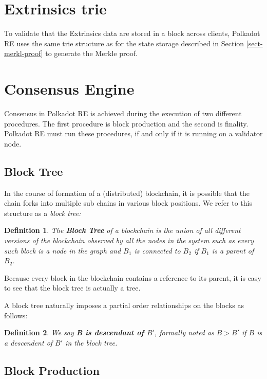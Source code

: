 \documentclass{article}
\newcommand{\tmem}[1]{{\em #1\/}}
\newcommand{\tmstrong}[1]{\textbf{#1}}
\newcommand{\tmtextbf}[1]{{\bfseries{#1}}}
\newcommand{\tmtextit}[1]{{\itshape{#1}}}
\newtheorem{definition}{Definition}
\providecommand{\tmem}[1]{\tmtextit{#1}}
\providecommand{\tmstrong}[1]{\tmtextbf{#1}}
\providecommand{\tmtextbf}[1]{\tmtextbf{#1}}
\providecommand{\tmtextit}[1]{\tmtextit{#1}}
\newtheorem{definition}{Definition}
\begin{document}
\section{Extrinsics trie}

To validate that the Extrinsics data are stored in a block across clients,
Polkadot RE uses the same trie structure as for the state storage described in
Section \ref{sect-merkl-proof} to generate the Merkle proof.

\section{Consensus Engine}

Consensus in Polkadot RE is achieved during the execution of two different
procedures. The first procedure is block production and the second is
finality. Polkadot RE must run these procedures, if and only if it is running
on a validator node.

\subsection{Block Tree}

In the course of formation of a (distributed) blockchain, it is possible that
the chain forks into multiple sub chains in various block positions. We refer
to this structure as a {\tmem{block tree:}}

\begin{definition}
  The {\tmstrong{Block Tree}} of a blockchain is the union of all different
  versions of the blockchain observed by all the nodes in the system such as
  every such block is a node in the graph and $B_1$ is connected to $B_2$ if
  $B_1$ is a parent of $B_2$.
\end{definition}

Because every block in the blockchain contains a reference to its parent, it
is easy to see that the block tree is actually a tree.

A block tree naturally imposes a partial order relationships on the blocks as
follows:

\begin{definition}
  We say {\tmstrong{B is descendant of $B'$}}, formally noted as {\tmstrong{$B
  > B'$}} if $B$ is a descendent of $B'$ in the block tree. 
\end{definition}

\subsection{Block Production}
\end{document}
